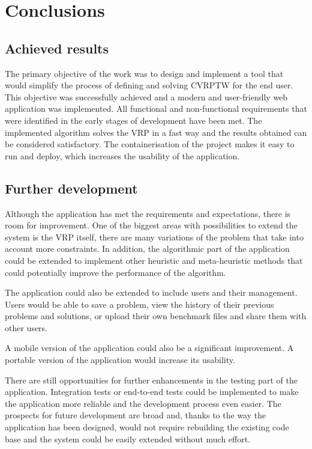 \documentclass[a4paper,twoside,12pt]{book}
\begin{document}
 

\chapter{Conclusions}
\section{Achieved results}
The primary objective of the work was to design and implement a tool that would simplify the process of defining and solving CVRPTW for the end user. This objective was successfully achieved and a modern and user-friendly web application was implemented. All functional and non-functional requirements that were identified in the early stages of development have been met. The implemented algorithm solves the VRP in a fast way and the results obtained can be considered satisfactory. The containerisation of the project makes it easy to run and deploy, which increases the usability of the application.

\section{Further development}
Although the application has met the requirements and expectations, there is room for improvement. One of the biggest areas with possibilities to extend the system is the VRP itself, there are many variations of the problem that take into account more constraints. In addition, the algorithmic part of the application could be extended to implement other heuristic and meta-heuristic methods that could potentially improve the performance of the algorithm.

The application could also be extended to include users and their management. Users would be able to save a problem, view the history of their previous problems and solutions, or upload their own benchmark files and share them with other users.

A mobile version of the application could also be a significant improvement. A portable version of the application would increase its usability.

There are still opportunities for further enhancements in the testing part of the application. Integration tests or end-to-end tests could be implemented to make the application more reliable and the development process even easier.
The prospects for future development are broad and, thanks to the way the application has been designed, would not require rebuilding the existing code base and the system could be easily extended without much effort.
\end{document}
